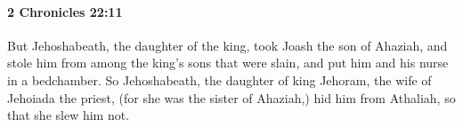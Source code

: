 
		\paragraph{2 Chronicles 22:11} %
			\label{2CHRONICLES-22-11}

			But Jehoshabeath, the daughter of the king, took Joash the son of Ahaziah, and stole him from among the king's sons that were slain, and put him and his nurse in a bedchamber. So Jehoshabeath, the daughter of king Jehoram, the wife of Jehoiada the priest, (for she was the sister of Ahaziah,) hid him from Athaliah, so that she slew him not.


